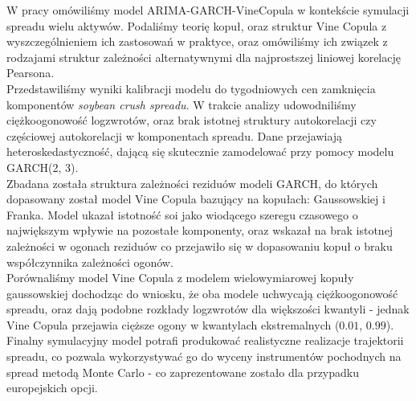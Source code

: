 \begin{wstep}[Wnioski]    %
	W pracy omówiliśmy model ARIMA-GARCH-VineCopula w kontekście symulacji spreadu wielu aktywów. Podaliśmy teorię kopuł, oraz struktur Vine Copula z wyszczególnieniem ich zastosowań w praktyce, oraz omówiliśmy ich związek z rodzajami struktur zależności alternatywnymi dla najprostszej liniowej korelację Pearsona.\\
	Przedstawiliśmy wyniki kalibracji modelu do tygodniowych cen zamknięcia komponentów \emph{soybean crush spreadu}. W trakcie analizy udowodniliśmy ciężkoogonowość logzwrotów, oraz brak istotnej struktury autokorelacji czy częściowej autokorelacji w komponentach spreadu. Dane przejawiają heteroskedastyczność, dającą się skutecznie zamodelować przy pomocy modelu GARCH(2, 3).\\
	Zbadana została struktura zależności reziduów modeli GARCH, do których dopasowany został model Vine Copula bazujący na kopułach: Gaussowskiej i Franka. Model ukazał istotność soi jako wiodącego szeregu czasowego o największym wpływie na pozostałe komponenty, oraz wskazał na brak istotnej zależności w ogonach reziduów co przejawiło się w dopasowaniu kopuł o braku współczynnika zależności ogonów.\\
	Porównaliśmy model Vine Copula z modelem wielowymiarowej kopuły gaussowskiej dochodząc do wniosku, że oba modele uchwycają ciężkoogonowość spreadu, oraz dają podobne rozkłady logzwrotów dla większości kwantyli - jednak Vine Copula przejawia cięższe ogony w kwantylach ekstremalnych ($0.01$, $0.99$).\\
	Finalny symulacyjny model potrafi produkować realistyczne realizacje trajektorii spreadu, co pozwala wykorzystywać go do wyceny instrumentów pochodnych na spread metodą Monte Carlo - co zaprezentowane zostało dla przypadku europejskich opcji.
	
\end{wstep}
